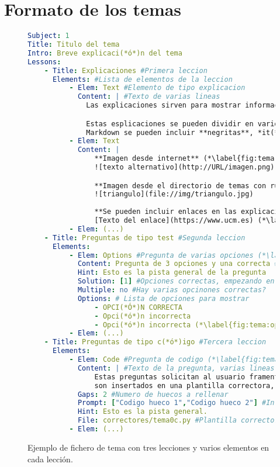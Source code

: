 \documentclass[]{article}
\begin{document}
\section{Formato de los temas}
\begin{figure}[tbp]
\begin{lstlisting}[language=yaml,basicstyle=\ttfamily\footnotesize]
Subject: 1
Title: Titulo del tema
Intro: Breve explicaci(*ó*)n del tema
Lessons:
    - Title: Explicaciones #Primera leccion
      Elements: #Lista de elementos de la leccion
          - Elem: Text #Elemento de tipo explicacion
            Content: | #Texto de varias lineas
              Las explicaciones sirven para mostrar informaci(*ó*)n al alumno. (*\label{fig:tema:exp1}*)

              Estas esplicaciones se pueden dividir en varios p(*á*)rrafos, y con 
              Markdown se pueden incluir **negritas**, *it(*a*)licas* y `c(*ó*)digo`. (*\label{fig:tema:exp2}*)
          - Elem: Text
            Content: |
                **Imagen desde internet** (*\label{fig:tema:exp3}*)
                ![texto alternativo](http://URL/imagen.png)

                **Imagen desde el directorio de temas con ruta relativa**
                ![triangulo](file://img/triangulo.jpg)
  
                **Se pueden incluir enlaces en las explicaciones:**
                [Texto del enlace](https://www.ucm.es) (*\label{fig:tema:exp4}*)
          - Elem: (...)
    - Title: Preguntas de tipo test #Segunda leccion
      Elements:
          - Elem: Options #Pregunta de varias opciones (*\label{fig:tema:opt1}*)
            Content: Pregunta de 3 opciones y una correcta #Texto de la pregunta
            Hint: Esto es la pista general de la pregunta
            Solution: [1] #Opciones correctas, empezando en 1
            Multiple: no #Hay varias opcinones correctas?
            Options: # Lista de opciones para mostrar
                - OPCI(*Ó*)N CORRECTA
                - Opci(*ó*)n incorrecta
                - Opci(*ó*)n incorrecta (*\label{fig:tema:opt2}*)
          - Elem: (...)
    - Title: Preguntas de tipo c(*ó*)igo #Tercera leccion
      Elements:
          - Elem: Code #Pregunta de codigo (*\label{fig:tema:code1}*)
            Content: | #Texto de la pregunta, varias lineas
                Estas preguntas solicitan al usuario framentos de c(*ó*)digo que
                son insertados en una plantilla correctora, que es evaluada.
            Gaps: 2 #Numero de huecos a rellenar
            Prompt: ["Codigo hueco 1","Codigo hueco 2"] #Informacion de cada hueco
            Hint: Esto es la pista general. 
            File: correctores/tema0c.py #Plantilla correctora con 'huecos' (*\label{fig:tema:code2}*)
          - Elem: (...)
\end{lstlisting}
\caption{Ejemplo de fichero de tema con tres lecciones y varios elementos en cada lección.\label{fig:tema}}
\end{figure}
\end{document}
